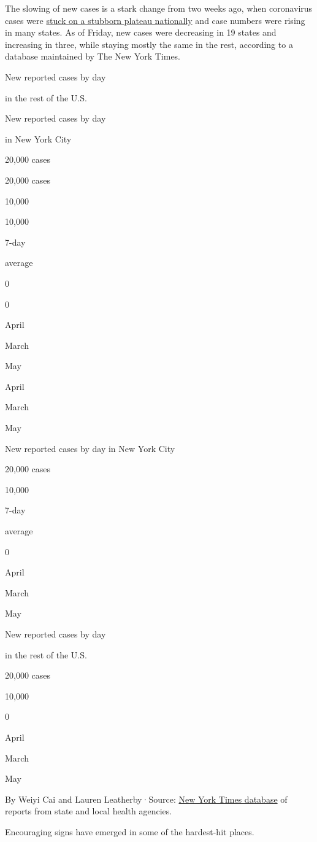 The slowing of new cases is a stark change from two weeks ago, when
coronavirus cases were
\href{https://www.nytimes3xbfgragh.onion/2020/05/05/us/coronavirus-deaths-cases-united-states.html}{stuck
on a stubborn plateau nationally} and case numbers were rising in many
states. As of Friday, new cases were decreasing in 19 states and
increasing in three, while staying mostly the same in the rest,
according to a database maintained by The New York Times.

New reported cases by day

in the rest of the U.S.

New reported cases by day

in New York City

20,000 cases

20,000 cases

10,000

10,000

7-day

average

0

0

April

March

May

April

March

May

New reported cases by day in New York City

20,000 cases

10,000

7-day

average

0

April

March

May

New reported cases by day

in the rest of the U.S.

20,000 cases

10,000

0

April

March

May

By Weiyi Cai and Lauren Leatherby·Source:
\href{https://www.nytimes3xbfgragh.onion/interactive/2020/us/coronavirus-us-cases.html}{New
York Times database} of reports from state and local health agencies.

Encouraging signs have emerged in some of the hardest-hit places.

